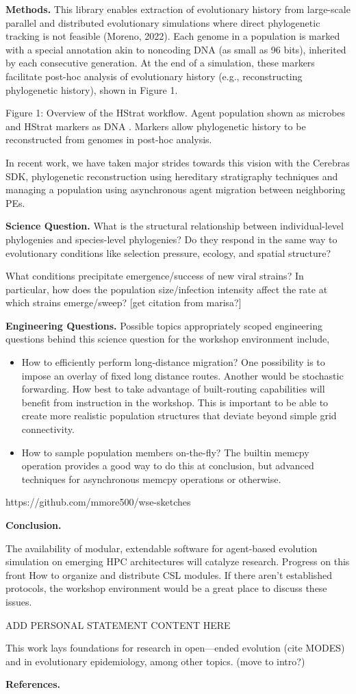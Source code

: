 \textbf{Methods.}
This library enables extraction of evolutionary history from large-scale parallel and distributed evolutionary simulations where direct phylogenetic tracking is not feasible (Moreno, 2022). Each genome in a population is marked with a special annotation akin to noncoding DNA (as small as 96 bits), inherited by each consecutive generation. At the end of a simulation, these markers facilitate post-hoc analysis of evolutionary history (e.g., reconstructing phylogenetic history), shown in Figure 1.

Figure 1: Overview of the HStrat workflow. Agent population shown as microbes and HStrat markers as DNA . Markers allow phylogenetic history to be reconstructed from genomes in post-hoc analysis.

In recent work, we have taken major strides towards this vision with the Cerebras SDK, phylogenetic reconstruction using hereditary stratigraphy techniques and managing a population using asynchronous agent migration between neighboring PEs.

\textbf{Science Question.}
What is the structural relationship between individual-level phylogenies and species-level phylogenies? Do they respond in the same way to evolutionary conditions like selection pressure, ecology, and spatial structure?

What conditions precipitate emergence/success of new viral strains? In particular, how does the population size/infection intensity affect the rate at which strains emerge/sweep?  [get citation from marisa?]

\textbf{Engineering Questions.}
Possible topics appropriately scoped engineering questions behind this science question for the workshop environment include,
\begin{itemize}
\item How to efficiently perform long-distance migration?
One possibility is to impose an overlay of fixed long distance routes.
Another would be stochastic forwarding.
How best to take advantage of built-routing capabilities will benefit from instruction in the workshop.
This is important to be able to create more realistic population structures that deviate beyond simple grid connectivity.
\item How to sample population members on-the-fly?
The builtin memcpy operation provides a good way to do this at conclusion, but advanced techniques for asynchronous memcpy operations or otherwise.
\end{itemize}

https://github.com/mmore500/wse-sketches

\textbf{Conclusion.}

The availability of modular, extendable software for agent-based evolution simulation on emerging HPC architectures will catalyze research. Progress on this front
How to organize and distribute CSL modules.
If there aren’t established protocols, the workshop environment would be a great place to discuss these issues.

ADD PERSONAL STATEMENT CONTENT HERE

This work lays foundations for research in open—ended evolution (cite MODES) and in evolutionary epidemiology, among other topics. (move to intro?)

\textbf{References.}